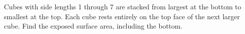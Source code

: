 Cubes with side lengths 1 through 7 are stacked from largest at the bottom to smallest at the top. Each cube rests entirely on the top face of the next larger cube. Find the exposed surface area, including the bottom.
